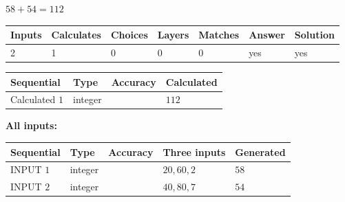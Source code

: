 \documentclass[12pt]{article}
\begin{document}
 
\noindent{}
 
 

$ %
58 +  %
54=   %
112$
 
 
\noindent{}
 
 

 
   
   
   
   
\noindent\begin{tabular}{|l|l|l|l|l|l|l|}
 \hline
Inputs & Calculates & Choices & Layers & Matches & Answer & Solution \\ \hline
 2  & 
 1  & 
 0
  & 
 0  & 
 0  & 
  yes & 
  yes 
  \\ \hline
 \end{tabular}
   
   
   
   
\noindent{}
   
   
  
  
\noindent\begin{tabular}{|l|l|l|l|}
\hline
 Sequential & Type & Accuracy & Calculated \\ 
\hline
 
 
  Calculated $  1 $ & integer &  & 
  $ 112 $ 
 \\  \hline  
 \end{tabular}
   
   
   
   
\noindent\vspace{0.1in}\hspace{-0.08in} {\textbf{\Large{All inputs: }}}
   
   
  
  
\noindent\begin{tabular}{|l|l|l|l|l|}
\hline
 Sequential & Type & Accuracy & Three inputs & Generated \\ 
\hline
 
 
  INPUT $  1 $ & integer &  & $
 20
 , 
 60
 , 
 2
 $ & $ 58 $ 
 \\  \hline  
 
 
  INPUT $  2 $ & integer &  & $
 40
 , 
 80
 , 
 7
 $ & $ 54 $ 
 \\  \hline  
 \end{tabular}
   
   
  
\end{document}
